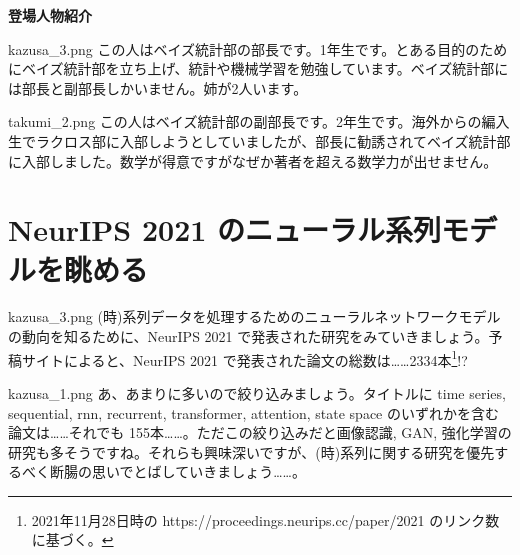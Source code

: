 \documentclass[b5paper,xelatex,ja=standard,10pt]{bxjsarticle}
\begin{document}
\vspace{6pt}
\centerline{\textbf{登場人物紹介}}

\vspace{3pt}
\begin{SERIFU}[colback=White, colbacktitle=PaleIris2, top=-1pt, bottom=0pt, left=18pt, right=10pt]{kazusa_3.png}
\small
この人はベイズ統計部の部長です。1年生です。とある目的のためにベイズ統計部を立ち上げ、統計や機械学習を勉強しています。ベイズ統計部には部長と副部長しかいません。姉が2人います。
\end{SERIFU}
\begin{SERIFU}[colback=White, colbacktitle=PaleGold2, top=-1pt, bottom=0pt, left=18pt, right=10pt]{takumi_2.png}
\small
この人はベイズ統計部の副部長です。2年生です。海外からの編入生でラクロス部に入部しようとしていましたが、部長に勧誘されてベイズ統計部に入部しました。数学が得意ですがなぜか著者を超える数学力が出せません。
\end{SERIFU}

\vspace{6pt}
\section*{NeurIPS 2021 のニューラル系列モデルを眺める}
\vspace{5pt}

\begin{SERIFU}[colback=PaleIris, colbacktitle=PaleIris2]{kazusa_3.png}
(時)系列データを処理するためのニューラルネットワークモデルの動向を知るために、NeurIPS 2021 で発表された研究をみていきましょう。予稿サイトによると、NeurIPS 2021 で発表された論文の総数は……2334本\footnote{2021年11月28日時の https://proceedings.neurips.cc/paper/2021 のリンク数に基づく。}!?
\end{SERIFU}

\begin{SERIFU}[colback=PaleIris, colbacktitle=PaleIris2]{kazusa_1.png}
あ、あまりに多いので絞り込みましょう。タイトルに time series, sequential, rnn, recurrent, transformer, attention, state space のいずれかを含む論文は……それでも 155本……。ただこの絞り込みだと画像認識, GAN, 強化学習の研究も多そうですね。それらも興味深いですが、(時)系列に関する研究を優先するべく断腸の思いでとばしていきましょう……。
\end{SERIFU}
\end{document}
